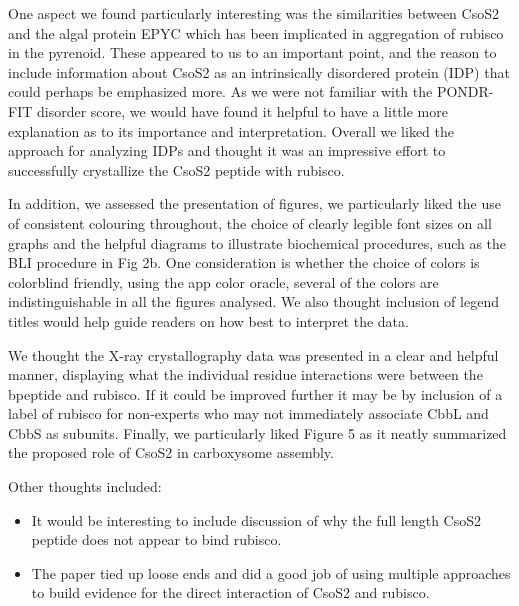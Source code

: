 \documentclass[10pt]{article}
\providecommand{\tightlist}{\setlength{\itemsep}{0pt}\setlength{\parskip}{0pt}}%
\begin{document}
\par\null

One aspect we found particularly interesting was the similarities
between CsoS2 and the algal protein EPYC which has been implicated in
aggregation of rubisco in the pyrenoid. These appeared to us to an
important point, and the reason to include information about CsoS2 as an
intrinsically disordered protein (IDP) that could perhaps be emphasized
more. As we were not familiar with the PONDR-FIT disorder score, we
would have found it helpful to have a little more explanation as to its
importance and interpretation. Overall we liked the approach for
analyzing IDPs and thought it was an impressive effort to successfully
crystallize the CsoS2 peptide with rubisco.~~

\par\null

In addition, we assessed the presentation of figures, we particularly
liked the use of consistent colouring throughout, the choice of clearly
legible font sizes on all graphs and the helpful diagrams to illustrate
biochemical procedures, such as the BLI procedure in Fig 2b. One
consideration is whether the choice of colors is colorblind friendly,
using the app color oracle, several of the colors are indistinguishable
in all the figures analysed. We also thought inclusion of legend titles
would help guide readers on how best to interpret the data.

\par\null

We thought the X-ray crystallography data was presented in a clear and
helpful manner, displaying what the individual residue interactions were
between the bpeptide and rubisco. If it could be improved further it may
be by inclusion of a label of rubisco for non-experts who may not
immediately associate CbbL and CbbS as subunits. Finally, we
particularly liked Figure 5 as it neatly summarized the proposed role of
CsoS2 in carboxysome assembly.

\par\null

Other thoughts included:

\begin{itemize}
\tightlist
\item
  It would be interesting to include discussion of why the full length
  CsoS2 peptide does not appear to bind rubisco.
\item
  The paper tied up loose ends and did a good job of using multiple
  approaches to build evidence for the direct interaction of CsoS2 and
  rubisco.
\end{itemize}

\par\null

\FloatBarrier
\end{document}
